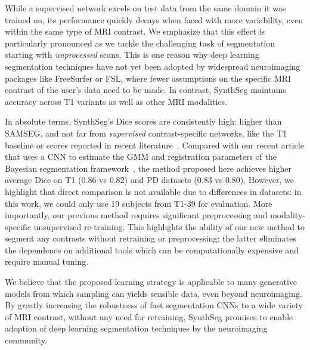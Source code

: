 \documentclass{midl}
\newcommand{\netname}{SynthSeg}
\begin{document}
While a supervised network excels on test data from the same domain it was trained on, its performance quickly decays when faced with more variability, even within the same type of MRI contrast. We emphasize that this effect is particularly pronounced as we tackle the challenging task of segmentation starting with \textit{unprocessed} scans. This is one reason why deep learning segmentation techniques have not yet been adopted by widespread neuroimaging packages like FreeSurfer or FSL, where fewer assumptions on the specific MRI contrast of the user's data need to be made. In contrast, \netname{} maintains accuracy across T1 variants as well as other MRI modalities.

In absolute terms, \netname{}'s Dice scores are consistently high: higher than SAMSEG, and not far from \textit{supervised} contrast-specific networks, like the T1 baseline or scores reported in recent literature~\cite{roy_quicknat_2019}. Compared with our recent article that uses a CNN to estimate the GMM and registration parameters of the Bayesian segmentation framework~\cite{dalca_unsupervised_2019}, the method proposed here achieves higher average Dice on T1 (0.86 vs 0.82) and PD datasets (0.83 vs 0.80). However, we highlight that direct comparison is not available due to differences in datasets: in this work, we could only use 19 subjects from T1-39 for evaluation. More importantly, our previous method requires significant preprocessing and modality-specific unsupervised re-training. This highlights the ability of our new method to segment any contrasts without retraining or preprocessing; the latter eliminates the dependence on additional tools which can be computationally expensive and require manual tuning.

We believe that the proposed learning strategy is applicable to many generative models from which sampling can yields sensible data, even beyond neuroimaging. By greatly increasing the robustness of fast segmentation CNNs to a wide variety of MRI contrast, without any need for retraining, \netname{} promises to enable adoption of deep learning segmentation techniques by the neuroimaging community.
\end{document}
